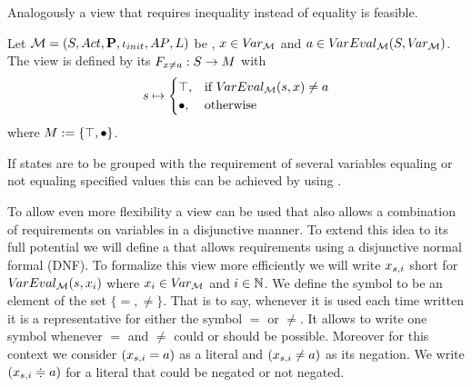 \documentclass[preview]{standalone}
\begin{document}
Analogously a view that requires inequality instead of equality is feasible.

\begin{definition}
	Let $\chgph = \chgphtuple$ be \achgphN, $\var \in \vars$ and $\varval \in \varevalimg$. The view \viewparamvaluesneq is defined by its \grpfctN $\gfctparamvaluesneq : \states \to \imggrp$ with
	\[
	\state \mapsto
	\begin{cases}
			\group, &\text{if } \vareval(\state, \var) \neq \varval\\
			\remelem, 	&\text{otherwise}
		\end{cases}
	\]
	where $\imggrp := \imggrpbinview$.
\end{definition}

If states are to be grouped with the requirement of several variables equaling or not equaling specified values this can be achieved by using \parllcompN.

To allow even more flexibility a view can be used that also allows a combination of requirements on variables in a disjunctive manner. To extend this idea to its full potential we will define a \viewN that allows requirements using a disjunctive normal formal (DNF). To formalize this view more efficiently we will write $\varstate[,i]$ short for $\vareval(\state, \var_i)$ where $x_i \in \vars$ and $i \in \natnums$. We define the symbol \eqorneq to be an element of the set $\{=,\neq\}$. That is to say, whenever it is used each time written it is a representative for either the symbol $=$ or $\neq$. It allows to write one symbol whenever $=$ and $\neq$ could or should be possible. Moreover for this context we consider $(\varstate[,i] = \varval)$ as a literal and $(\varstate[,i] \neq \varval)$ as its negation. We write $(\varstate[,i] \eqorneq \varval)$ for a literal that could be negated or not negated.
\end{document}
